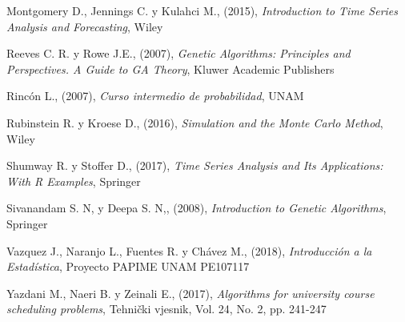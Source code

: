 \begin{thebibliography}{X}
 Montgomery D., Jennings C. y Kulahci M., (2015), \textit{Introduction to Time Series Analysis and Forecasting}, Wiley

 Reeves C. R. y Rowe J.E., (2007), \textit{Genetic Algorithms: Principles and Perspectives. A Guide to GA Theory}, Kluwer Academic Publishers \label{ReevesRowe}

 Rincón L., (2007), \textit{Curso intermedio de probabilidad}, UNAM

 Rubinstein R. y Kroese D., (2016), \textit{Simulation and the Monte Carlo Method}, Wiley%

 Shumway R. y Stoffer D., (2017), \textit{Time Series Analysis and Its Applications: With R Examples}, Springer

 Sivanandam S. N, y Deepa S. N,, (2008), \textit{Introduction to Genetic Algorithms}, Springer

 Vazquez J., Naranjo L., Fuentes R. y Chávez M., (2018), \textit{Introducción a la Estadística}, Proyecto PAPIME UNAM PE107117 \label{MargaritaJaimeRuthLizbeth} %

 Yazdani M., Naeri B. y Zeinali E., (2017), \textit{Algorithms for university course scheduling problems}, Tehnički vjesnik, Vol. 24, No. 2, pp. 241-247 \label{Yazdani}












\end{thebibliography}
